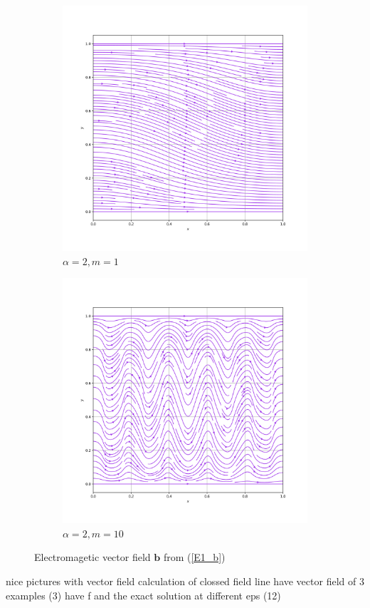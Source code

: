 \documentclass[12pt,a4paper]{article}
\begin{document}
\begin{figure}[H]
 \begin{subfigure}{0.5\textwidth}
     \includegraphics[width=\textwidth]{Pics/VectorField/E1b_a2_m1.png}
     \caption{$\alpha=2, m=1$}
 \end{subfigure}
   \begin{subfigure}{0.5\textwidth}
     \includegraphics[width=\textwidth]{Pics/VectorField/E1b_a2_m10.png}
     \caption{$\alpha=2, m=10$}
 \end{subfigure}
 \caption{Electromagetic vector field $\mathbf{b}$ from (\ref{E1_b})} \label{E1_VFs}
\end{figure}
nice pictures with vector field
calculation of clossed field line
have vector field of 3 examples (3)
have f and the exact solution at different eps (12)
\end{document}
